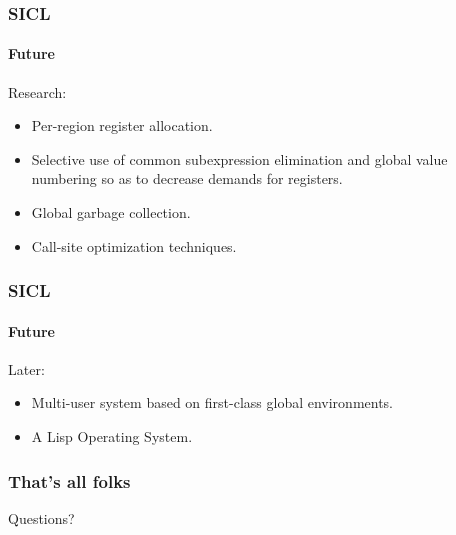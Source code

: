 \documentclass{beamer}
\begin{document}
\begin{frame}
  \frametitle{SICL}
  \framesubtitle{Future}

Research:

\begin{itemize}
\item Per-region register allocation.
\item Selective use of common subexpression elimination and global
  value numbering so as to decrease demands for registers.
\item Global garbage collection.
\item Call-site optimization techniques. 
\end{itemize}

\end{frame}
\begin{frame}
  \frametitle{SICL}
  \framesubtitle{Future}
Later:
\begin{itemize}
\item Multi-user system based on first-class global environments. 
\item A Lisp Operating System.
\end{itemize}
\end{frame}
\begin{frame}
  \frametitle{That's all folks}
  
Questions?

\end{frame}
\end{document}
